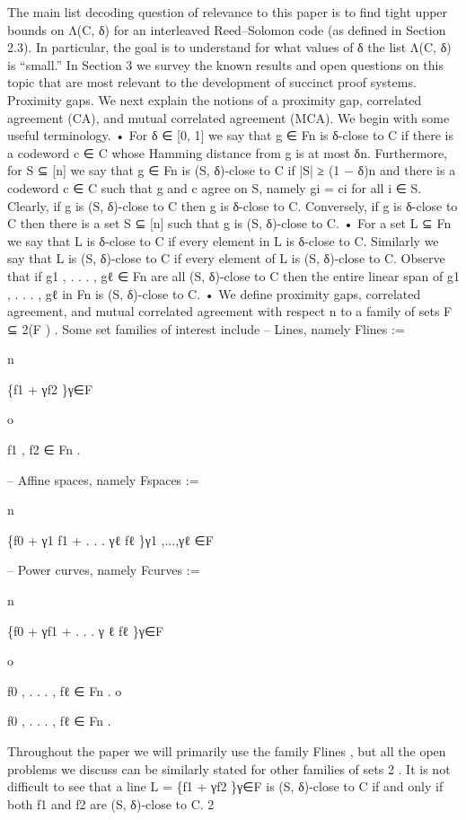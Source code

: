 \documentclass[11pt]{article}
\begin{document}
The main list decoding question of relevance to this paper is to find tight upper bounds on Λ(C, δ)
for an interleaved Reed–Solomon code (as defined in Section 2.3). In particular, the goal is to
understand for what values of δ the list Λ(C, δ) is “small.” In Section 3 we survey the known
results and open questions on this topic that are most relevant to the development of succinct
proof systems.
Proximity gaps. We next explain the notions of a proximity gap, correlated agreement (CA),
and mutual correlated agreement (MCA). We begin with some useful terminology.
• For δ ∈ [0, 1] we say that g ∈ Fn is δ-close to C if there is a codeword c ∈ C whose Hamming
distance from g is at most δn. Furthermore, for S ⊆ [n] we say that g ∈ Fn is (S, δ)-close to C
if |S| ≥ (1 − δ)n and there is a codeword c ∈ C such that g and c agree on S, namely gi = ci for
all i ∈ S. Clearly, if g is (S, δ)-close to C then g is δ-close to C. Conversely, if g is δ-close to C
then there is a set S ⊆ [n] such that g is (S, δ)-close to C.
• For a set L ⊆ Fn we say that L is δ-close to C if every element in L is δ-close to C. Similarly we say
that L is (S, δ)-close to C if every element of L is (S, δ)-close to C. Observe that if g1 , . . . , gℓ ∈ Fn
are all (S, δ)-close to C then the entire linear span of g1 , . . . , gℓ in Fn is (S, δ)-close to C.
• We define proximity gaps, correlated agreement, and mutual correlated agreement with respect
n
to a family of sets F ⊆ 2(F ) . Some set families of interest include
– Lines, namely Flines :=

n

\{f1 + γf2 \}γ∈F

o

f1 , f2 ∈ Fn .

– Affine spaces, namely Fspaces :=

n

\{f0 + γ1 f1 + . . . γℓ fℓ \}γ1 ,...,γℓ ∈F

– Power curves, namely Fcurves :=

n

\{f0 + γf1 + . . . γ ℓ fℓ \}γ∈F

o

f0 , . . . , fℓ ∈ Fn .
o

f0 , . . . , fℓ ∈ Fn .

Throughout the paper we will primarily use the family Flines , but all the open problems we
discuss can be similarly stated for other families of sets 2 . It is not difficult to see that a line
L = \{f1 + γf2 \}γ∈F is (S, δ)-close to C if and only if both f1 and f2 are (S, δ)-close to C.
2
\end{document}
